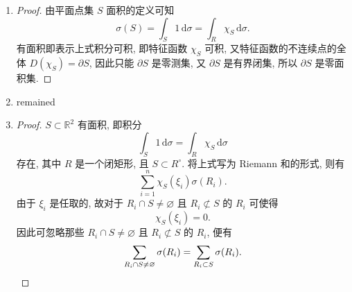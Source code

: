 % 
\begin{enumerate}
    \item %
        \begin{proof}
            由平面点集 $S$ 面积的定义可知
            \[
                \sigma(S) = \int_S1\,\mathrm{d}\sigma = \int_R\chi_S\,\mathrm{d}\sigma.    
            \]
            有面积即表示上式积分可积, 即特征函数 $\chi_S$ 可积, 又特征函数的不连续点的全体 $D(\chi_S) = \partial{S}$,
            因此只能 $\partial{S}$ 是零测集, 又 $\partial{S}$ 是有界闭集, 所以 $\partial{S}$ 是零面积集.
        \end{proof}
    \item %
        {\color{red}remained}
    \item %
        \begin{proof}
            $S \subset \mathbb{R}^2$ 有面积, 即积分
            \[
                \int_S1\,\mathrm{d}\sigma = \int_R\chi_S\,\mathrm{d}\sigma    
            \]
            存在, 其中 $R$ 是一个闭矩形, 且 $S \subset R^\circ$. 将上式写为 Riemann 和的形式, 则有
            \[
                \sum_{i=1}^n\chi_S(\xi_i)\sigma(R_i).    
            \]
            由于 $\xi_i$ 是任取的, 故对于 $R_i \cap S \not= \varnothing$ 且 $R_i \not\subset S$ 的 $R_i$ 可使得
            \[
                \chi_S(\xi_i) = 0.    
            \]
            因此可忽略那些 $R_i \cap S \not= \varnothing$ 且 $R_i \not\subset S$ 的 $R_i$, 便有
            \[
                \sum_{R_i \cap S \not= \varnothing}\sigma(R_i) = \sum_{R_i \subset S}\sigma(R_i). \qedhere    
            \]
        \end{proof}
\end{enumerate}
% 
